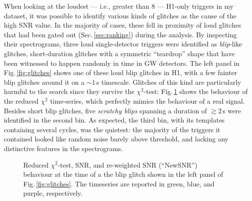 \documentclass[binding=0.6cm, LaM]{sapthesis}
\begin{document}
	When looking at the loudest --- i.e., greater than 8 --- H1-only triggers in my dataset,
	it was possible to identify various kinds of glitches as the cause of the high SNR value.
	In the majority of cases, these fell in proximity of loud glitches that had been gated out (Sec.\,\ref{sec:ranking}) during the analysis.
	By inspecting their spectrograms, three loud single-detector triggers were identified as {\it blip}-like glitches,
	short-duration glitches with a symmetric ``teardrop'' shape that have been witnessed to happen randomly in time in GW detectors.
	The left panel in Fig.\,\ref{fig:glitches} shows one of these loud blip glitches in H1, with a few fainter blip glitches around it on a $\sim 1\,$s timescale.
        Glitches of this kind are particularly harmful to the search since they survive the $\chi^2$-test: 
	Fig.\,\ref{fig:chisquared} shows the behaviour of the reduced $\chi^2$ time-series, which perfectly mimics the behaviour of a real signal.
	Besides short blip glitches, five \emph{scratchy blips} spanning a duration of $\gtrsim 2\,$s were identified in the second bin.
	As expected, the third bin, with its templates containing several cycles, was the quietest: the majority of the triggers it contained looked like random noise barely above threshold, and 
	lacking any distinctive features in the spectrograms.

	 \begin{figure}[t]
          \noindent
          \label{chisquared}
          \centering
          \caption{Reduced $\chi^2$-test, SNR, and re-weighted SNR
            (``NewSNR'') behaviour at the time of a the blip glitch
            shown in the left panel of Fig.\,\ref{fig:glitches}.  The
            timeseries are reported in green, blue, and purple,
            respectively.}
          \label{fig:chisquared}
        \end{figure}
\end{document}
